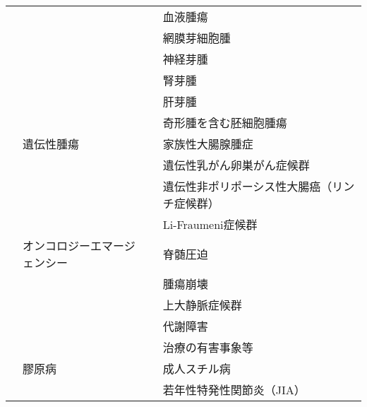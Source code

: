 \begin{xltabular}{\linewidth}{XXXX}
 &  &  & 血液腫瘍 \\
 &  &  & 網膜芽細胞腫 \\
 &  &  & 神経芽腫 \\
 &  &  & 腎芽腫 \\
 &  &  & 肝芽腫 \\
 &  &  & 奇形腫を含む胚細胞腫瘍 \\
 & 遺伝性腫瘍 &  & 家族性大腸腺腫症 \\
 &  &  & 遺伝性乳がん卵巣がん症候群 \\
 &  &  & 遺伝性非ポリポーシス性大腸癌（リンチ症候群） \\
 &  &  & Li-Fraumeni症候群 \\
 & オンコロジーエマージェンシー &  & 脊髄圧迫 \\
 &  &  & 腫瘍崩壊 \\
 &  &  & 上大静脈症候群 \\
 &  &  & 代謝障害 \\
 &  &  & 治療の有害事象等 \\
 & 膠原病 &  & 成人スチル病 \\
 &  &  & 若年性特発性関節炎（JIA） \\
\bottomrule
\end{xltabular}
